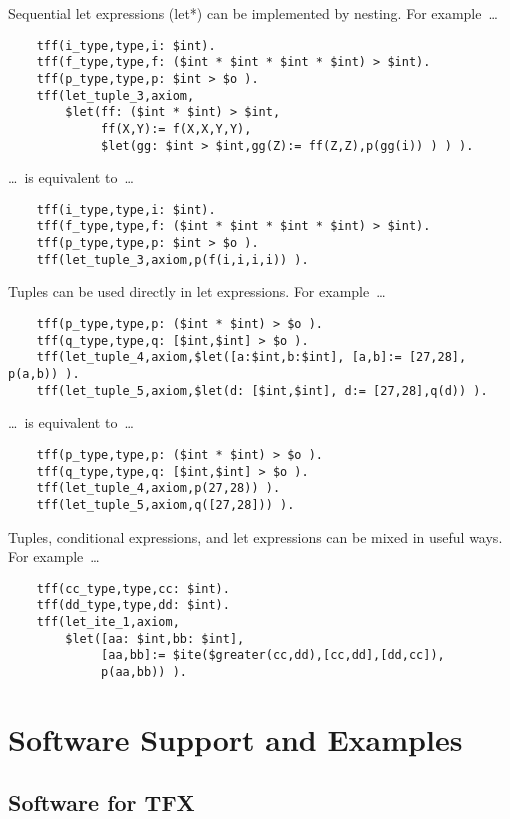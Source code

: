 \documentclass{easychair}
\begin{document}
Sequential let expressions (let*) can be implemented by nesting. 
For example~\ldots
\begin{verbatim}
    tff(i_type,type,i: $int).
    tff(f_type,type,f: ($int * $int * $int * $int) > $int).
    tff(p_type,type,p: $int > $o ).
    tff(let_tuple_3,axiom,
        $let(ff: ($int * $int) > $int,
             ff(X,Y):= f(X,X,Y,Y),
             $let(gg: $int > $int,gg(Z):= ff(Z,Z),p(gg(i)) ) ) ).
\end{verbatim}
\ldots~is equivalent to~\ldots
\begin{verbatim}
    tff(i_type,type,i: $int).
    tff(f_type,type,f: ($int * $int * $int * $int) > $int).
    tff(p_type,type,p: $int > $o ).
    tff(let_tuple_3,axiom,p(f(i,i,i,i)) ).
\end{verbatim}
Tuples can be used directly in let expressions. 
For example~\ldots
\begin{verbatim}
    tff(p_type,type,p: ($int * $int) > $o ).
    tff(q_type,type,q: [$int,$int] > $o ).
    tff(let_tuple_4,axiom,$let([a:$int,b:$int], [a,b]:= [27,28], p(a,b)) ).
    tff(let_tuple_5,axiom,$let(d: [$int,$int], d:= [27,28],q(d)) ).
\end{verbatim}
\ldots~is equivalent to~\ldots
\begin{verbatim}
    tff(p_type,type,p: ($int * $int) > $o ).
    tff(q_type,type,q: [$int,$int] > $o ).
    tff(let_tuple_4,axiom,p(27,28)) ).
    tff(let_tuple_5,axiom,q([27,28])) ).
\end{verbatim}
Tuples, conditional expressions, and let expressions can be mixed in useful 
ways. 
For example~\ldots

\begin{verbatim}
    tff(cc_type,type,cc: $int).
    tff(dd_type,type,dd: $int).
    tff(let_ite_1,axiom,
        $let([aa: $int,bb: $int],
             [aa,bb]:= $ite($greater(cc,dd),[cc,dd],[dd,cc]),
             p(aa,bb)) ).
\end{verbatim}

\section{Software Support and Examples}
\label{ImplementationExamples}

\subsection{Software for TFX}
\label{Software}
\end{document}

